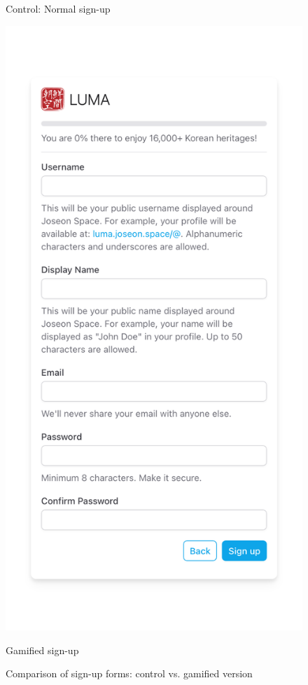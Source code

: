 \documentclass[conference]{IEEEtran}
\begin{document}
\begin{figure}[h]
\begin{minipage}{0.49\linewidth}
        \caption{Control: Normal sign-up}
    \end{minipage}
    \hfill
    \begin{minipage}{0.49\linewidth}
        \centering
        \includegraphics[width=\linewidth]{media/v2.png}
        \caption{Gamified sign-up}
    \end{minipage}
    \caption{Comparison of sign-up forms: control vs. gamified version}
\end{figure}
\end{document}
